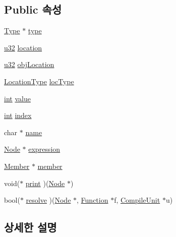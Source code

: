 \subsection*{Public 속성}
\begin{DoxyCompactItemize}
\item 
\mbox{\hyperlink{struct_type}{Type}} $\ast$ \mbox{\hyperlink{struct_node_ae5bfe58e068d3ebbf9e5de3b9429ce78}{type}}
\item 
\mbox{\hyperlink{_system_8h_a10e94b422ef0c20dcdec20d31a1f5049}{u32}} \mbox{\hyperlink{struct_node_af29d6730c1ae4dfa7a901ae7611b0973}{location}}
\item 
\mbox{\hyperlink{_system_8h_a10e94b422ef0c20dcdec20d31a1f5049}{u32}} \mbox{\hyperlink{struct_node_ab16254ec466168164ba6e5790396c3cc}{obj\+Location}}
\item 
\mbox{\hyperlink{elf_8h_af2e75a10adf1443b5204c7856bbf630d}{Location\+Type}} \mbox{\hyperlink{struct_node_a844bc1a892e4efae954736f91a068ba2}{loc\+Type}}
\item 
\mbox{\hyperlink{_util_8cpp_a0ef32aa8672df19503a49fab2d0c8071}{int}} \mbox{\hyperlink{struct_node_aaa0cd30d78a90c5a6ab64eb3d58b8f87}{value}}
\item 
\mbox{\hyperlink{_util_8cpp_a0ef32aa8672df19503a49fab2d0c8071}{int}} \mbox{\hyperlink{struct_node_ac8055cdbda20cacce417192557741ab8}{index}}
\item 
char $\ast$ \mbox{\hyperlink{struct_node_a059a0ea6f86dce9fd919c08a707b360b}{name}}
\item 
\mbox{\hyperlink{struct_node}{Node}} $\ast$ \mbox{\hyperlink{struct_node_a1a1f36a3a65310a67b4e6e10b595d5a4}{expression}}
\item 
\mbox{\hyperlink{struct_member}{Member}} $\ast$ \mbox{\hyperlink{struct_node_aa221d21bde05ecda9cca447fdd550ca0}{member}}
\item 
void($\ast$ \mbox{\hyperlink{struct_node_a8023bbc1d73f9273930ef05ef20f7404}{print}} )(\mbox{\hyperlink{struct_node}{Node}} $\ast$)
\item 
bool($\ast$ \mbox{\hyperlink{struct_node_a9d300576a9dcaf307b6c3b7da0d24ede}{resolve}} )(\mbox{\hyperlink{struct_node}{Node}} $\ast$, \mbox{\hyperlink{struct_function}{Function}} $\ast$f, \mbox{\hyperlink{struct_compile_unit}{Compile\+Unit}} $\ast$u)
\end{DoxyCompactItemize}


\subsection{상세한 설명}


